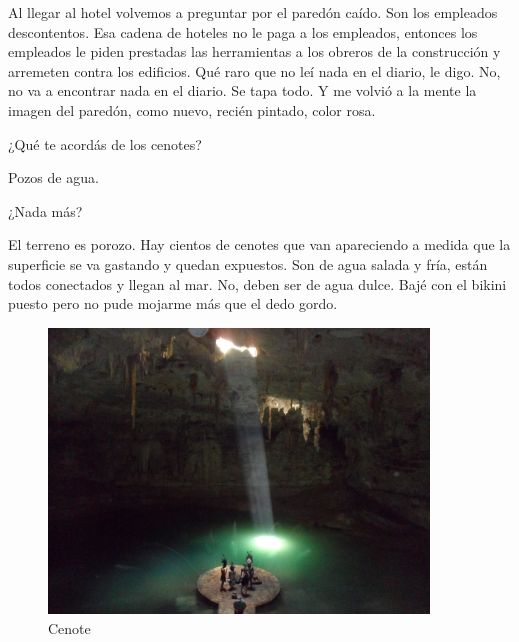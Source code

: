 \documentclass[12pt,twoside,openright,a5paper]{book}
\begin{document}
\vspace{0.5cm}
\hrulefill\hspace{0.2cm} \decofourleft\decofourright \hspace{0.2cm} \hrulefill
\vspace{0.5cm}

Al llegar al hotel volvemos a preguntar por el paredón caído. Son los
empleados descontentos. Esa cadena de hoteles no le paga a los empleados,
entonces los empleados le piden prestadas las herramientas a los obreros de
la construcción y arremeten contra los edificios. Qué raro que no leí
nada en el diario, le digo. No, no va a encontrar nada en el diario. Se
tapa todo. Y me volvió a la mente la imagen del paredón, como nuevo,
recién pintado, color rosa.


\vspace{0.5cm}
\hrulefill\hspace{0.2cm} \decofourleft\decofourright \hspace{0.2cm} \hrulefill
\vspace{0.5cm}

¿Qué te acordás de los cenotes?

Pozos de agua.

¿Nada más?

El terreno es porozo. Hay cientos de cenotes que van apareciendo a medida
que la superficie se va gastando y quedan expuestos. Son de agua salada
y fría, están todos conectados y llegan al mar. No, deben ser de agua
dulce. Bajé con el bikini puesto pero no pude mojarme más que el dedo gordo.


\begin{figure}[H]
  \centering
    \includegraphics[width=0.9\textwidth]{fotos/2012/cenote}
  \caption{Cenote} \label{Cenote}
\end{figure}
\end{document}

